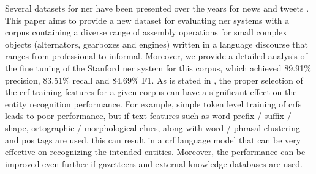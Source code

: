 Several datasets for \gls{ner} have been presented over the years for news and tweets \cite{Dojchinovski2013,Roder2014}. This paper aims to provide a new dataset for evaluating \gls{ner} systems with a corpus containing a diverse range of assembly operations for small complex objects (alternators, gearboxes and engines) written in a language discourse that ranges from professional to informal. Moreover, we provide a detailed analysis of the fine tuning of the Stanford \gls{ner} system for this corpus, which achieved 89.91\% precision, 83.51\% recall and 84.69\% F1. As is stated in \cite{Tkachenko2012}, the proper selection of the \gls{crf} training features for a given corpus can have a significant effect on the entity recognition performance. For example, simple token level training of \glspl{crf} leads to poor performance, but if text features such as word prefix / suffix / shape, ortographic / morphological clues, along with word / phrasal clustering and \gls{pos} tags are used, this can result in a \gls{crf} language model that can be very effective on recognizing the intended entities. Moreover, the performance can be improved even further if gazetteers and external knowledge databases are used.
